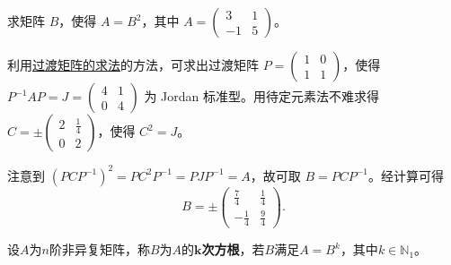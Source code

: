 \documentclass[../../main.tex]{subfiles}
\begin{document}
\begin{example}
求矩阵 $B$，使得 $A = B^2$，其中 $A = \begin{pmatrix}
3 & 1 \\
-1 & 5
\end{pmatrix}$。
\end{example}
\begin{solution}
利用\hyperref[section:过渡矩阵的求法]{过渡矩阵的求法}的方法，可求出过渡矩阵 $P = \begin{pmatrix}
1 & 0 \\
1 & 1
\end{pmatrix}$，使得 $P^{-1}AP = J = \begin{pmatrix}
4 & 1 \\
0 & 4
\end{pmatrix}$ 为 Jordan 标准型。用待定元素法不难求得 $C = \pm\begin{pmatrix}
2 & \frac{1}{4} \\
0 & 2
\end{pmatrix}$，使得 $C^2 = J$。

注意到 $(PCP^{-1})^2 = PC^2P^{-1} = PJP^{-1} = A$，故可取 $B = PCP^{-1}$。经计算可得
\[B = \pm\begin{pmatrix}
\frac{7}{4} & \frac{1}{4} \\
-\frac{1}{4} & \frac{9}{4}
\end{pmatrix}. \]
\end{solution}

\begin{definition}
设$A$为$n$阶非异复矩阵，称$B$为$A$的\textbf{$\boldsymbol{k}$次方根}，若$B$满足$A=B^k$，其中$k\in \mathbb{N} _1$。
\end{definition}
\end{document}

